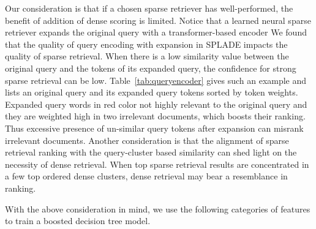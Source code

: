 {Our consideration 
    is that  if a chosen
sparse retriever has  well-performed, the benefit of addition of dense scoring  is limited. 
Notice that a learned neural sparse retriever expands the original query with a transformer-based encoder
We found that the quality of query encoding with expansion in SPLADE impacts the quality of sparse retrieval. 
When  there is a low similarity value  between the original query and the tokens of 
its expanded  query, the confidence for  strong sparse retrieval can be low.
Table~\ref{tab:queryencoder} gives such an example and lists an original query and its expanded query tokens
sorted by token weights.  Expanded query words  in red color
not highly relevant to the original query and they are weighted high in two irrelevant documents, which boosts their ranking.  
Thus    excessive presence of un-similar  query tokens  after expansion  can misrank irrelevant documents. 
Another consideration is that the alignment of sparse retrieval ranking  with the 
query-cluster based similarity can shed light  on the necessity of  dense retrieval.
When top sparse retrieval results are concentrated in a few top  ordered dense clusters, dense retrieval may bear
a resemblance  in  ranking.


With the above consideration  in mind, we use the  following categories of features
to train a boosted decision tree model.

}
